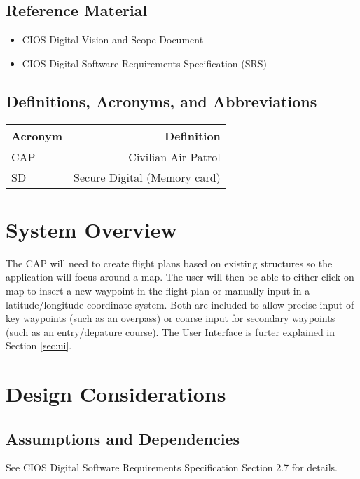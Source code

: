 \documentclass[12pt, letterpaper]{article}
\begin{document}
  \subsection{Reference Material}
    \begin{itemize}
      \setlength{\itemsep}{1pt}
      \setlength{\parskip}{0pt}
      \setlength{\parsep}{0pt}
      \item CIOS Digital Vision and Scope Document
      \item CIOS Digital Software Requirements Specification (SRS)
    \end{itemize}

  \subsection{Definitions, Acronyms, and Abbreviations}
  	\begin{tabularx}{\textwidth}{|l|R|} \hline
    	Acronym & Definition \\ \hline
    	CAP & Civilian Air Patrol  \\ \hline
    	SD & Secure Digital (Memory card) \\ \hline
  	\end{tabularx}

  \section{System Overview}\label{system}
    The CAP will need to create flight plans based on existing structures so the application will focus around a map.
    The user will then be able to either click on map to insert a new waypoint in the flight plan or manually input in a latitude/longitude coordinate system.
    Both are included to allow precise input of key waypoints (such as an overpass) or coarse input for secondary waypoints (such as an entry/depature course).
    The User Interface is furter explained in Section \ref{sec:ui}.


\newpage
\section{Design Considerations} \label{dsign}
  \subsection{Assumptions and Dependencies}
    See CIOS Digital Software Requirements Specification Section 2.7 for details.
\end{document}
